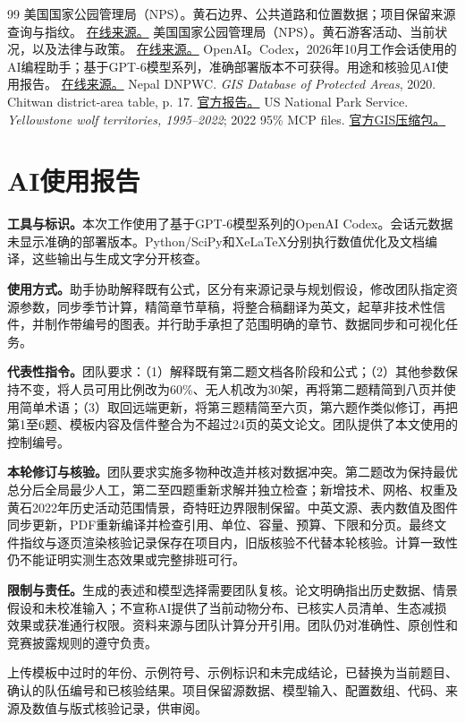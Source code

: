 \documentclass[12pt,a4paper]{article}
\numberwithin{equation}{section}
\begin{document}
\begin{thebibliography}{99}
 美国国家公园管理局（NPS）。黄石边界、公共道路和位置数据；项目保留来源查询与指纹。 \href{https://irma.nps.gov/DataStore/Reference/Profile/2316784}{在线来源。}
 美国国家公园管理局（NPS）。黄石游客活动、当前状况，以及法律与政策。 \href{https://www.nps.gov/yell/learn/management/lawsandpolicies.htm}{在线来源。}
 OpenAI。Codex，2026年10月工作会话使用的AI编程助手；基于GPT-6模型系列，准确部署版本不可获得。用途和核验见AI使用报告。 \href{https://openai.com/codex/}{在线来源。}
 Nepal DNPWC. \emph{GIS Database of Protected Areas}, 2020. Chitwan district-area table, p. 17. \href{https://giwmscdntwo.gov.np/media/pages/files/Final%20Report_GIS%20Database_v4olikj.pdf}{官方报告。}
 US National Park Service. \emph{Yellowstone wolf territories, 1995--2022}; 2022 95\% MCP files. \href{https://www.nps.gov/yell/learn/nature/upload/1995_2022-YELL-wolf-data.zip}{官方GIS压缩包。}
\end{thebibliography}
\endgroup
\clearpage

\begingroup
\titleformat{\section}{\fontsize{16}{24}\selectfont\bfseries}{}{0pt}{}
\section*{AI使用报告}
\endgroup
{}
\textbf{工具与标识。}本次工作使用了基于GPT-6模型系列的OpenAI Codex\cite{codex}。会话元数据未显示准确的部署版本。Python/SciPy和XeLaTeX分别执行数值优化及文档编译，这些输出与生成文字分开核查。

\textbf{使用方式。}助手协助解释既有公式，区分有来源记录与规划假设，修改团队指定资源参数，同步季节计算，精简章节草稿，将整合稿翻译为英文，起草非技术性信件，并制作带编号的图表。并行助手承担了范围明确的章节、数据同步和可视化任务。

\textbf{代表性指令。}团队要求：（1）解释既有第二题文档各阶段和公式；（2）其他参数保持不变，将人员可用比例改为60\%、无人机改为30架，再将第二题精简到八页并使用简单术语；（3）取回远端更新，将第三题精简至六页，第六题作类似修订，再把第1至6题、模板内容及信件整合为不超过24页的英文论文。团队提供了本文使用的控制编号。

\textbf{本轮修订与核验。}团队要求实施多物种改造并核对数据冲突。第二题改为保持最优总分后全局最少人工，第二至四题重新求解并独立检查；新增技术、网格、权重及黄石2022年历史活动范围情景，奇特旺边界限制保留。中英文源、表内数值及图件同步更新，PDF重新编译并检查引用、单位、容量、预算、下限和分页。最终文件指纹与逐页渲染核验记录保存在项目内，旧版核验不代替本轮核验。计算一致性仍不能证明实测生态效果或完整排班可行。

\textbf{限制与责任。}生成的表述和模型选择需要团队复核。论文明确指出历史数据、情景假设和未校准输入；不宣称AI提供了当前动物分布、已核实人员清单、生态减损效果或获准通行权限。资料来源与团队计算分开引用。团队仍对准确性、原创性和竞赛披露规则的遵守负责。

上传模板中过时的年份、示例符号、示例标识和未完成结论，已替换为当前题目、确认的队伍编号和已核验结果。项目保留源数据、模型输入、配置数组、代码、来源及数值与版式核验记录，供审阅。
\end{document}

